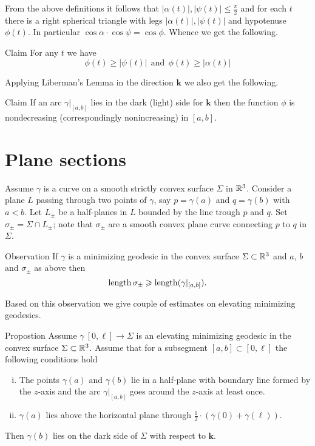 \documentclass[a4paper,10pt]{amsart}
\begin{document}
From the above definitions it follows that $|\alpha(t)|,|\psi(t)|\le \tfrac\pi2$ and for each $t$ there is a right spherical triangle with legs $|\alpha(t)|,|\psi(t)|$ and hypotenuse $\phi(t)$.
In particular $\cos\alpha\cdot\cos\psi=\cos\phi$.
Whence we get the following.

\begin{thm}{Claim}
For any $t$ we have 
\[
\phi(t)\ge |\psi(t)|\ \ \text{and}\ \ \phi(t)\ge |\alpha(t)|
\]

\end{thm}

Applying Liberman's Lemma in the direction $\bm{k}$ we also get the following.

\begin{thm}{Claim}
If an arc $\gamma|_{[a,b]}$ lies in the dark (light) side for $\bm{k}$ then 
the function $\phi$ is nondecreasing (correspondingly nonincreasing)
in $[a,b]$.
\end{thm}

\section{Plane sections}

Assume $\gamma$ is a curve on a smooth strictly convex surface $\Sigma$ in $\mathbb{R}^3$.
Consider a plane $L$ 
passing through two points of $\gamma$, 
say $p=\gamma(a)$ and $q=\gamma(b)$ with $a<b$.
Let $L_\pm$ be a  half-planes in $L$ bounded by the line trough $p$ and $q$.
Set $\sigma_\pm=\Sigma\cap L_\pm$;
note that $\sigma_\pm$ are a smooth convex plane curve connecting $p$ to $q$ in $\Sigma$.

\begin{thm}{Observation}\label{obs:cut}
If $\gamma$ is a minimizing geodesic in the convex surface $\Sigma\subset \mathbb{R}^3$ and $a$, $b$ and $\sigma_\pm$ as above then
\[\mathop{\rm length}\nolimits\sigma_\pm\geqslant\mathop{\rm length}\nolimits(\gamma|_{[a,b]}).\]
\end{thm}

Based on this observation we give couple of estimates on elevating minimizing geodesics.

\begin{thm}{Propostion}\label{prop:around-once}
Assume $\gamma\:[0,\ell]\to \Sigma$ is an elevating minimizing geodesic in the convex surface $\Sigma\subset \mathbb{R}^3$.
Assume that for a subsegment $[a,b]\subset [0,\ell]$ the following conditions hold
\begin{enumerate}[(i)]
\item The points $\gamma(a)$ and $\gamma(b)$ lie in a half-plane with boundary line formed by the $z$-axis
and  the arc $\gamma|_{[a,b]}$ goes around the $z$-axis at least once.
\item $\gamma(a)$ lies above the horizontal plane through $\tfrac12\cdot(\gamma(0)+\gamma(\ell))$.
\end{enumerate}
Then  $\gamma(b)$ lies on the dark side of $\Sigma$ with respect to $\bm{k}$.
\end{thm}
\end{document}
